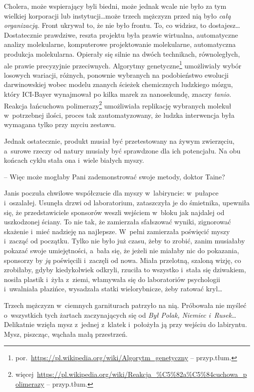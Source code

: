 \documentclass[oneside,polish,11pt,sfheadings]{mwbk}
\begin{document}
Cholera, może wspierający byli biedni, może jednak wcale nie było za tym
wielkiej korporacji lub instytucji\ldots może trzech mężczyzn przed nią
było \emph{całą organizacją}. Front ukrywał to, że nie było frontu. To,
co widzisz, to dostajesz\ldots Dostatecznie prawdziwe, reszta projektu była
prawie wirtualna, automatyczne analizy molekularne, komputerowe
projektowanie molekularne, automatyczna produkcja molekularna. Opierały
się silnie na dwóch technikach, równoległych, ale prawie precyzyjnie
przeciwnych. Algorytmy genetyczne\footnote{
por.~\url{https://pl.wikipedia.org/wiki/Algorytm\_genetyczny}
-- przyp.tłum.} umożliwiały wybór losowych wariacji, różnych, ponownie
wybranych na podobieństwo ewolucji darwinowskiej wobec modelu znanych
ścieżek chemicznych ludzkiego mózgu, który ICI-Bayer wynajmował po kilka
marek za nanosekundę, znaczy \emph{tanio}. Reakcja łańcuchowa polimerazy\footnote{więcej~\url{https://pl.wikipedia.org/wiki/Reakcja\_\%C5\%82a\%C5\%84cuchowa\_polimerazy}
-- przyp.tłum.} umożliwiała replikację wybranych molekuł w~potrzebnej
ilości, proces tak zautomatyzowany, że ludzka interwencja była wymagana
tylko przy myciu zestawu.

Jednak ostatecznie, produkt musiał być przetestowany na żywym
zwierzęciu, a~surowe rzeczy od natury musiały być sprawdzone dla ich
potencjału. Na obu końcach cyklu stała ona i~wiele białych myszy.

-- Więc może mogłaby Pani zademonstrować swoje metody, doktor Taine?

Janis poczuła chwilowe współczucie dla myszy w~labiryncie: w~pułapce i~oszalałej. Usunęła drzwi od laboratorium, zataszczyła je do śmietnika,
upewniła się, że przedstawiciele sponsorów weszli wejściem w~bloku jak
najdalej od uszkodzonej ściany. To nie tak, że zamierzała sfałszować
wyniki, zignorować skażenie i~mieć nadzieję na najlepsze. W~pełni
zamierzała poświęcić myszy i~zacząć od początku. Tylko nie było już
czasu, żeby to zrobić, zanim musiałaby pokazać swoje umiejętności, a~bała się, że jeżeli nie miałaby nic do pokazania, sponsorzy by \emph{ją}
poświęcili i~zaczęli od nowa. Miała przelotną, szaloną wizję, co
zrobiłaby, gdyby kiedykolwiek odkryli, rzuciła to wszystko i~stała się
dziwakiem, nosiła plastik i~żyła z~ziemi, włamywała się do laboratoriów
psychologii i~uwalniała płazińce, wysadzała statki wielorybnicze, żeby
ratować kryl\ldots

Trzech mężczyzn w~ciemnych garniturach patrzyło na nią. Próbowała nie
myśleć o~wszystkich tych żartach zaczynających się od \emph{Był Polak,
Niemiec i~Rusek}\ldots Delikatnie wzięła mysz z~jednej z~klatek i~położyła
ją przy wejściu do labiryntu. Mysz, piszcząc, wąchała małą przestrzeń.
\end{document}

